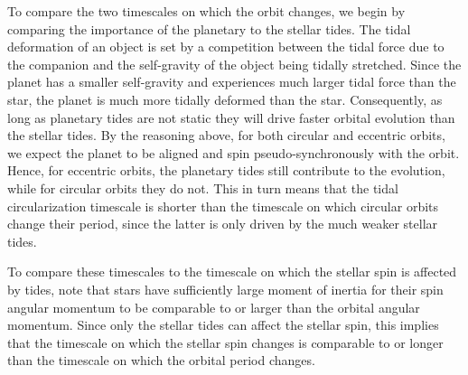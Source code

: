 To compare the two timescales on which the orbit changes, we begin by comparing
the importance of the planetary to the stellar tides. The tidal deformation of
an object is set by a competition between the tidal force due to the companion
and the self-gravity of the object being tidally stretched. Since the planet has
a smaller self-gravity and experiences much larger tidal force than the star,
the planet is much more tidally deformed than the star. Consequently, as long as
planetary tides are not static they will drive faster orbital evolution than the
stellar tides. By the reasoning above, for both circular and eccentric orbits,
we expect the planet to be aligned and spin pseudo-synchronously with the orbit.
Hence, for eccentric orbits, the planetary tides still contribute to the
evolution, while for circular orbits they do not. This in turn means that the
tidal circularization timescale is shorter than the timescale on which circular
orbits change their period, since the latter is only driven by the much weaker
stellar tides.

To compare these timescales to the timescale on which the stellar spin is
affected by tides, note that stars have sufficiently large moment of inertia
for their spin angular momentum to be comparable to or larger than the orbital
angular momentum. Since only the stellar tides can affect the stellar spin, this
implies that the timescale on which the stellar spin changes is comparable to or
longer than the timescale on which the orbital period changes.
